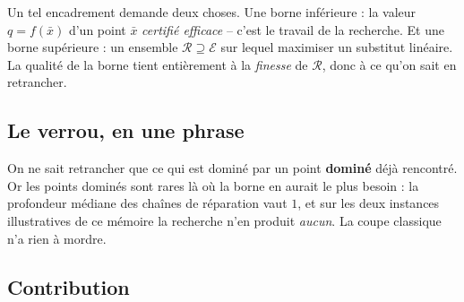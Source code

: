 \documentclass[11pt,a4paper]{article}
\theoremstyle{plain}
\theoremstyle{remark}
\newcommand{\Ecal}{\mathcal{E}}
\newcommand{\Rcal}{\mathcal{R}}
\begin{document}
Un tel encadrement demande deux choses. Une borne inférieure : la valeur
$q=f(\bar x)$ d'un point $\bar x$ \emph{certifié efficace} -- c'est le
travail de la recherche. Et une borne supérieure : un ensemble
$\Rcal\supseteq\Ecal$ sur lequel maximiser un substitut linéaire. La qualité
de la borne tient entièrement à la \emph{finesse} de $\Rcal$, donc à ce qu'on
sait en retrancher.

\subsection{Le verrou, en une phrase}

On ne sait retrancher que ce qui est dominé par un point \textbf{dominé}
déjà rencontré. Or les points dominés sont rares là où la borne en aurait le
plus besoin : la profondeur médiane des chaînes de réparation vaut $1$, et
sur les deux instances illustratives de ce mémoire la recherche n'en produit
\emph{aucun}. La coupe classique n'a rien à mordre.

\subsection{Contribution}
\end{document}
